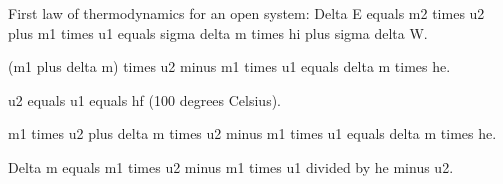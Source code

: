 First law of thermodynamics for an open system:  
Delta E equals m2 times u2 plus m1 times u1 equals sigma delta m times hi plus sigma delta W.  

(m1 plus delta m) times u2 minus m1 times u1 equals delta m times he.  

u2 equals u1 equals hf (100 degrees Celsius).  

m1 times u2 plus delta m times u2 minus m1 times u1 equals delta m times he.  

Delta m equals m1 times u2 minus m1 times u1 divided by he minus u2.